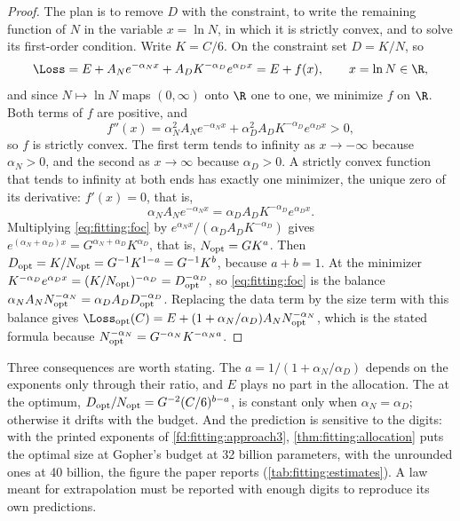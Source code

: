 \begin{refsection}
\begin{proof}
The plan is to remove $D$ with the constraint, to write the remaining function of $N$ in the variable $x=\ln N$, in which it is strictly convex, and to solve its first-order condition. Write $K=C/6$. On the constraint set $D=K/N$, so
\[
\Loss=E+A_Ne^{-\alpha_Nx}+A_DK^{-\alpha_D}e^{\alpha_Dx}=E+f(x),\qquad x=\ln N\in\R,
\]
and since $N\mapsto\ln N$ maps $(0,\infty)$ onto $\R$ one to one, we minimize $f$ on $\R$. Both terms of $f$ are positive, and
\[
f''(x)=\alpha_N^2A_Ne^{-\alpha_Nx}+\alpha_D^2A_DK^{-\alpha_D}e^{\alpha_Dx}>0,
\]
so $f$ is strictly convex. The first term tends to infinity as $x\to-\infty$ because $\alpha_N>0$, and the second as $x\to\infty$ because $\alpha_D>0$. A strictly convex function that tends to infinity at both ends has exactly one minimizer, the unique zero of its derivative: $f'(x)=0$, that is,
\begin{equation}\label{eq:fitting:foc}
\alpha_NA_Ne^{-\alpha_Nx}=\alpha_DA_DK^{-\alpha_D}e^{\alpha_Dx}.
\end{equation}
Multiplying \eqref{eq:fitting:foc} by $e^{\alpha_Nx}/(\alpha_DA_DK^{-\alpha_D})$ gives $e^{(\alpha_N+\alpha_D)x}=G^{\alpha_N+\alpha_D}K^{\alpha_D}$, that is, $N_{\mathrm{opt}}=GK^{a}$. Then $D_{\mathrm{opt}}=K/N_{\mathrm{opt}}=G^{-1}K^{1-a}=G^{-1}K^{b}$, because $a+b=1$. At the minimizer $K^{-\alpha_D}e^{\alpha_Dx}=(K/N_{\mathrm{opt}})^{-\alpha_D}=D_{\mathrm{opt}}^{-\alpha_D}$, so \eqref{eq:fitting:foc} is the balance $\alpha_NA_NN_{\mathrm{opt}}^{-\alpha_N}=\alpha_DA_DD_{\mathrm{opt}}^{-\alpha_D}$. Replacing the data term by the size term with this balance gives $\Loss_{\mathrm{opt}}(C)=E+(1+\alpha_N/\alpha_D)A_N\fittingNopt^{-\alpha_N}$, which is the stated formula because $N_{\mathrm{opt}}^{-\alpha_N}=G^{-\alpha_N}K^{-\alpha_Na}$.
\end{proof}

Three consequences are worth stating. The  $a=1/(1+\alpha_N/\alpha_D)$ depends on the exponents only through their ratio, and $E$ plays no part in the allocation. The  at the optimum, $D_{\mathrm{opt}}/N_{\mathrm{opt}}=G^{-2}(C/6)^{b-a}$, is constant only when $\alpha_N=\alpha_D$; otherwise it drifts with the budget. And the prediction is sensitive to the digits: with the printed exponents of \cref{fd:fitting:approach3}, \cref{thm:fitting:allocation} puts the optimal size at Gopher's budget at 32 billion parameters, with the unrounded ones at 40 billion, the figure the paper reports (\cref{tab:fitting:estimates}). A law meant for extrapolation must be reported with enough digits to reproduce its own predictions.


\end{refsection}
